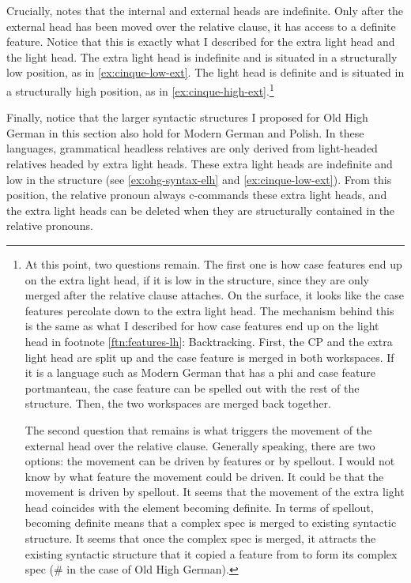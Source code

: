 Crucially, \citet{cinqueforthcoming} notes that the internal and external heads are indefinite. Only after the external head has been moved over the relative clause, it has access to a definite feature. Notice that this is exactly what I described for the extra light head and the light head. The extra light head is indefinite and is situated in a structurally low position, as in \ref{ex:cinque-low-ext}. The light head is definite and is situated in a structurally high position, as in \ref{ex:cinque-high-ext}.\footnote{
At this point, two questions remain. The first one is how case features end up on the extra light head, if it is low in the structure, since they are only merged after the relative clause attaches. On the surface, it looks like the case features percolate down to the extra light head. The mechanism behind this is the same as what I described for how case features end up on the light head in footnote \ref{ftn:features-lh}: Backtracking. First, the CP and the extra light head are split up and the case feature is merged in both workspaces. If it is a language such as Modern German that has a phi and case feature portmanteau, the case feature can be spelled out with the rest of the structure. Then, the two workspaces are merged back together.

The second question that remains is what triggers the movement of the external head over the relative clause. Generally speaking, there are two options: the movement can be driven by features or by spellout. I would not know by what feature the movement could be driven. It could be that the movement is driven by spellout. It seems that the movement of the extra light head coincides with the element becoming definite. In terms of spellout, becoming definite means that a complex spec is merged to existing syntactic structure. It seems that once the complex spec is merged, it attracts the existing syntactic structure that it copied a feature from to form its complex spec (\# in the case of Old High German).
}

Finally, notice that the larger syntactic structures I proposed for Old High German in this section also hold for Modern German and Polish. In these languages, grammatical headless relatives are only derived from light-headed relatives headed by extra light heads. These extra light heads are indefinite and low in the structure (see \ref{ex:ohg-syntax-elh} and \ref{ex:cinque-low-ext}). From this position, the relative pronoun always c-commands these extra light heads, and the extra light heads can be deleted when they are structurally contained in the relative pronouns.


